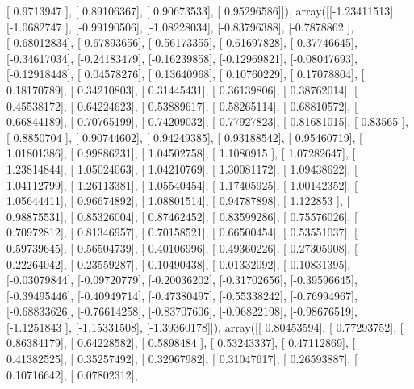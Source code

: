 \documentclass{article}
\begin{document}
       [ 0.9713947 ],
       [ 0.89106367],
       [ 0.90673533],
       [ 0.95296586]]), array([[-1.23411513],
       [-1.0682747 ],
       [-0.99190506],
       [-1.08228034],
       [-0.83796388],
       [-0.7878862 ],
       [-0.68012834],
       [-0.67893656],
       [-0.56173355],
       [-0.61697828],
       [-0.37746645],
       [-0.34617034],
       [-0.24183479],
       [-0.16239858],
       [-0.12969821],
       [-0.08047693],
       [-0.12918448],
       [ 0.04578276],
       [ 0.13640968],
       [ 0.10760229],
       [ 0.17078804],
       [ 0.18170789],
       [ 0.34210803],
       [ 0.31445431],
       [ 0.36139806],
       [ 0.38762014],
       [ 0.45538172],
       [ 0.64224623],
       [ 0.53889617],
       [ 0.58265114],
       [ 0.68810572],
       [ 0.66844189],
       [ 0.70765199],
       [ 0.74209032],
       [ 0.77927823],
       [ 0.81681015],
       [ 0.83565   ],
       [ 0.8850704 ],
       [ 0.90744602],
       [ 0.94249385],
       [ 0.93188542],
       [ 0.95460719],
       [ 1.01801386],
       [ 0.99886231],
       [ 1.04502758],
       [ 1.1080915 ],
       [ 1.07282647],
       [ 1.23814844],
       [ 1.05024063],
       [ 1.04210769],
       [ 1.30081172],
       [ 1.09438622],
       [ 1.04112799],
       [ 1.26113381],
       [ 1.05540454],
       [ 1.17405925],
       [ 1.00142352],
       [ 1.05644411],
       [ 0.96674892],
       [ 1.08801514],
       [ 0.94787898],
       [ 1.122853  ],
       [ 0.98875531],
       [ 0.85326004],
       [ 0.87462452],
       [ 0.83599286],
       [ 0.75576026],
       [ 0.70972812],
       [ 0.81346957],
       [ 0.70158521],
       [ 0.66500454],
       [ 0.53551037],
       [ 0.59739645],
       [ 0.56504739],
       [ 0.40106996],
       [ 0.49360226],
       [ 0.27305908],
       [ 0.22264042],
       [ 0.23559287],
       [ 0.10490438],
       [ 0.01332092],
       [ 0.10831395],
       [-0.03079844],
       [-0.09720779],
       [-0.20036202],
       [-0.31702656],
       [-0.39596645],
       [-0.39495446],
       [-0.40949714],
       [-0.47380497],
       [-0.55338242],
       [-0.76994967],
       [-0.68833626],
       [-0.76614258],
       [-0.83707606],
       [-0.96822198],
       [-0.98676519],
       [-1.1251843 ],
       [-1.15331508],
       [-1.39360178]]), array([[ 0.80453594],
       [ 0.77293752],
       [ 0.86384179],
       [ 0.64228582],
       [ 0.5898484 ],
       [ 0.53243337],
       [ 0.47112869],
       [ 0.41382525],
       [ 0.35257492],
       [ 0.32967982],
       [ 0.31047617],
       [ 0.26593887],
       [ 0.10716642],
       [ 0.07802312],
\end{document}
